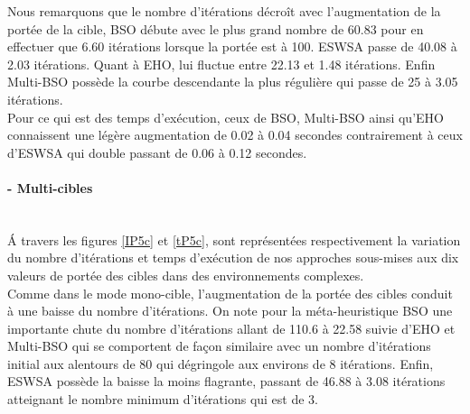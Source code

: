 	Nous remarquons que le nombre d'itérations décroît avec l'augmentation de la portée de la cible, BSO débute avec le plus grand nombre de 60.83 pour en effectuer que 6.60 itérations lorsque la portée est à 100. ESWSA passe de 40.08 à 2.03 itérations. Quant à EHO, lui fluctue entre 22.13 et 1.48 itérations. Enfin Multi-BSO possède la courbe descendante la plus régulière qui passe de 25 à 3.05 itérations.\\
	
	Pour ce qui est des temps d'exécution, ceux de BSO, Multi-BSO ainsi qu'EHO connaissent une légère augmentation de 0.02 à 0.04 secondes contrairement à ceux d'ESWSA qui double passant de 0.06 à 0.12 secondes.
	
	
	
	\noindent
	\hspace{-0.5cm}
	\begin{minipage}[t]{0.55\textwidth}
		\captionsetup{width=0.8\linewidth}
		\centering{}
		\label{IP1c}
	\end{minipage}\hfill
	\begin{minipage}[t]{0.55\textwidth}
		\centering{}
		\label{tP1c}
	\end{minipage}\hfill
	
	\paragraph{- Multi-cibles}
	\textbf{ }\\
	\'{A} travers les figures \ref{IP5c} et \ref{tP5c}, sont représentées respectivement la variation du nombre d'itérations et temps d'exécution de nos approches sous-mises aux dix valeurs de portée des cibles dans des environnements complexes.\\
	
	Comme dans le mode mono-cible, l'augmentation de la portée des cibles conduit à une baisse du nombre d'itérations. On note pour la méta-heuristique BSO une importante chute du nombre d'itérations allant de 110.6 à 22.58 suivie d'EHO et Multi-BSO qui se comportent de façon similaire avec un nombre d'itérations initial aux alentours de 80 qui dégringole aux environs de 8 itérations. Enfin, ESWSA possède la baisse la moins flagrante, passant de 46.88 à 3.08 itérations atteignant le nombre minimum d'itérations qui est de 3.\\
	
